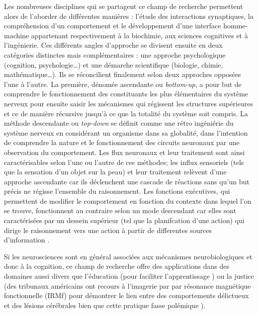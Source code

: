 \documentclass[12pt,fleqn,oneside,french,openany]{book} %
\begin{document}
Les nombreuses disciplines qui se partagent ce champ de recherche permettent alors de l'aborder de différentes manières : l'étude des interactions synaptiques, la compréhension d'un comportement et le développement d'une interface homme-machine appartenant respectivement à la biochimie, aux sciences cognitives et à l'ingénierie. Ces différents angles d'approche se divisent ensuite en deux catégories distinctes mais complémentaires : une approche psychologique (cognition, psychologie…) et une démarche scientifique (biologie, chimie, mathématique…). Ils se réconcilient finalement selon deux approches opposées l'une à l'autre. La première, dénomée ascendante ou \emph{bottom-up}, a pour but de comprendre le fonctionnement des constituants les plus élémentaires du système nerveux pour ensuite saisir les mécanismes qui régissent les structures supérieures et ce de manière récursive jusqu'à ce que la totalité du système soit compris. La méthode descendante ou \emph{top-down} se définit comme une rétro ingéniérie du système nerveux en considérant un organisme dans sa globalité, dans l'intention de comprendre la nature et le fonctionnement des circuits neuronaux par une observation du comportement. Les flux neuronaux et leur traitement sont ainsi caractérisables selon l'une ou l'autre de ces méthodes; les influx sensoriels (tels que la sensation d'un objet sur la peau) et leur traitement relèvent d'une approche ascendante car ils déclenchent une cascade de réactions sans qu'un but précis ne régisse l'ensemble du raisonnement. Les fonctions exécutives, qui permettent de modifier le comportement en fonction du contexte dans lequel l'on se trouve, fonctionnent au contraire selon un mode descendant car elles sont caractérisées par un dessein supérieur (tel que la planifcation d'une action) qui dirige le raisonnement vers une action à partir de differentes sources d'information \cite{bottomupTopdown,foncExec}. 

Si les neurosciences sont en général associées aux mécanismes neurobiologiques et donc à la cognition, ce champ de recherche offre des applications dans des domaines aussi divers que l'éducation (pour faciliter l'apprentissage \cite{pedagogie}) ou la justice (des tribunaux américains ont recours à l'imagerie par par résonance magnétique fonctionnelle (IRMf) pour démontrer le lien entre des comportements délictueux et des lésions cérébrales bien que cette pratique fasse polémique \cite{justice}).
\end{document}
